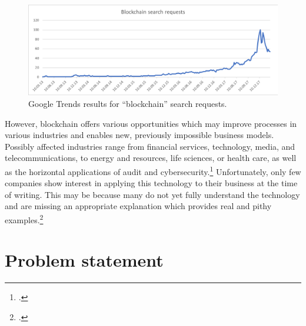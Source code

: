 \begin{figure}
    \centering
    \includegraphics[width=\textwidth]{latex-vorlage_v1.5/graphics/BCRQ.png}
    \caption[Google Trends results for \enquote{blockchain} search requests.]{Google Trends results for \enquote{blockchain} search requests.\protect\footnotemark}
    \label{fig:SearchRequests}
\end{figure}

However, blockchain offers various opportunities which may improve processes in various industries and enables new, previously impossible business models. Possibly affected industries range from financial services, technology, media, and telecommunications, to energy and resources, life sciences, or health care, as well as the horizontal applications of audit and cybersecurity.\footcite[Cf.][]{SchatskybitcoinBlockchaincoming2015} Unfortunately, only few companies show interest in applying this technology to their business at the time of writing. This may be because many do not yet fully understand the technology and are missing an appropriate explanation which provides real and pithy examples.\footcite[Cf.][P88]{BjoernPaulewicz_Interview}



\section{Problem statement} \label{sec:Problem}

